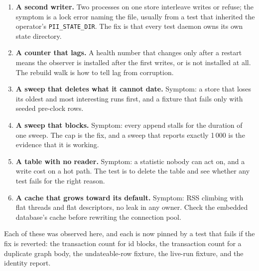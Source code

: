 \begin{enumerate}
	\item \textbf{A second writer.} Two processes on one store interleave writes or refuse; the
	symptom is a lock error naming the file, usually from a test that inherited the operator's
	\texttt{PII\_STATE\_DIR}. The fix is that every test daemon owns its own state directory.
	\item \textbf{A counter that lags.} A health number that changes only after a restart means
	the observer is installed after the first writes, or is not installed at all. The rebuild
	walk is how to tell lag from corruption.
	\item \textbf{A sweep that deletes what it cannot date.} Symptom: a store that loses its
	oldest and most interesting runs first, and a fixture that fails only with seeded pre-clock
	rows.
	\item \textbf{A sweep that blocks.} Symptom: every append stalls for the duration of one
	sweep. The cap is the fix, and a sweep that reports exactly 1\,000 is the evidence that it
	is working.
	\item \textbf{A table with no reader.} Symptom: a statistic nobody can act on, and a write
	cost on a hot path. The test is to delete the table and see whether any test fails for the
	right reason.
	\item \textbf{A cache that grows toward its default.} Symptom: RSS climbing with flat
	threads and flat descriptors, no leak in any owner. Check the embedded database's cache
	before rewriting the connection pool.
\end{enumerate}

Each of these was observed here, and each is now pinned by a test that fails if the fix is
reverted: the transaction count for id blocks, the transaction count for a duplicate graph
body, the undateable-row fixture, the live-run fixture, and the identity report.
